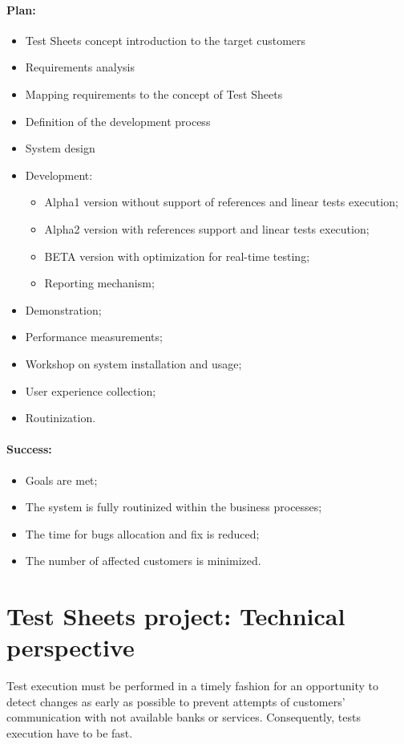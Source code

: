 \paragraph{Plan:}
\begin{itemize}
	\item Test Sheets concept introduction to the target customers
	\item Requirements analysis 
	\item Mapping requirements to the concept of Test Sheets
	\item Definition of the development process
	\item System design
	\item Development:
	\begin{itemize}
		\item Alpha1 version without support of references and linear tests execution;
		\item Alpha2 version with references support and linear tests execution;
		\item BETA version with optimization for real-time testing;
		\item Reporting mechanism;
	\end{itemize}
	\item Demonstration;
	\item Performance measurements;
	\item Workshop on system installation and usage;
	\item User experience collection;
	\item Routinization.
\end{itemize}

\paragraph{Success:}
\begin{itemize}
	\item Goals are met;
	\item The system is fully routinized within the business processes;
	\item The time for bugs allocation and fix is reduced;
	\item The number of affected customers is minimized.
\end{itemize}


\section{Test Sheets project: Technical perspective}
Test execution must be performed in a timely fashion for an opportunity to detect changes as early as possible to prevent attempts of customers' communication with not available banks or services. Consequently, tests execution have to be fast.


